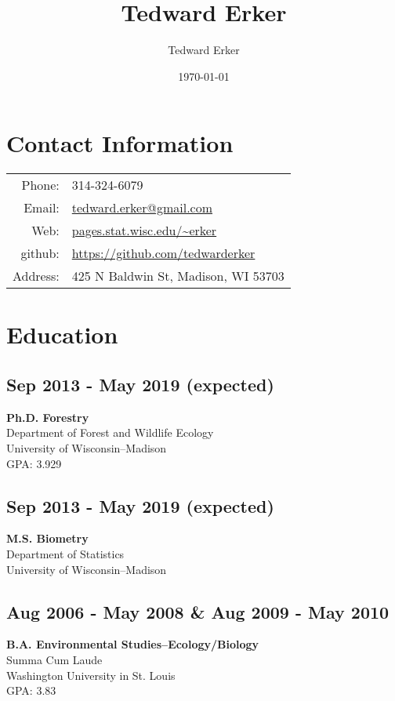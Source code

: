 \documentclass{article}
\author{Tedward Erker}
\date{\today}
\title{Tedward Erker}
\begin{document}
\maketitle
\section*{Contact Information}
\label{sec:orga3fa3d1}
\begin{center}
\begin{tabular}{rp{}}
Phone: & 314-324-6079\\
Email: & \href{mailto:erker@wisc.edu}{tedward.erker@gmail.com}\\
Web: & \href{http://pages.stat.wisc.edu/\~erker/}{pages.stat.wisc.edu/\textasciitilde{}erker}\\
github: & \url{https://github.com/tedwarderker}\\
Address: & 425 N Baldwin St, Madison, WI 53703\\
\end{tabular}
\end{center}

\section*{Education}
\label{sec:orgcd8c0a9}
\subsection*{Sep 2013 - May 2019 (expected)}
\label{sec:orgf18d3cd}
\textbf{Ph.D. Forestry} \\
Department of Forest and Wildlife Ecology \\
University of Wisconsin--Madison \\
GPA: 3.929

\subsection*{Sep 2013 - May 2019 (expected)}
\label{sec:org5280b43}
\textbf{M.S. Biometry} \\
Department of Statistics \\
University of Wisconsin--Madison

\subsection*{Aug 2006 - May 2008 \& Aug 2009 - May 2010}
\label{sec:org001e3b4}
\textbf{B.A. Environmental Studies--Ecology/Biology} \\
Summa Cum Laude \\
Washington University in St. Louis \\
GPA: 3.83
\end{document}
